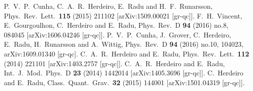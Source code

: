\documentclass[12pt]{article}
\begin{document}
\begin{small}
\begin{thebibliography}{99}
  P.~V.~P.~Cunha, C.~A.~R.~Herdeiro, E.~Radu and H.~F.~Runarsson,
  Phys.\ Rev.\ Lett.\  {\bf 115} (2015)   211102
  [arXiv:1509.00021 [gr-qc]].
  F.~H.~Vincent, E.~Gourgoulhon, C.~Herdeiro and E.~Radu,
  Phys.\ Rev.\ D {\bf 94} (2016) no.8,  084045
  [arXiv:1606.04246 [gr-qc]].
  P.~V.~P.~Cunha, J.~Grover, C.~Herdeiro, E.~Radu, H.~Runarsson and A.~Wittig,
 Phys.\ Rev.\ D {\bf 94} (2016) no.10,  104023, arXiv:1609.01340 [gr-qc].
  C.~A.~R.~Herdeiro and E.~Radu,
  Phys.\ Rev.\ Lett.\  {\bf 112} (2014) 221101
  [arXiv:1403.2757 [gr-qc]].
  C.~A.~R.~Herdeiro and E.~Radu,
  Int.\ J.\ Mod.\ Phys.\ D {\bf 23} (2014)   1442014
  [arXiv:1405.3696 [gr-qc]].
  C.~Herdeiro and E.~Radu,
  Class.\ Quant.\ Grav.\  {\bf 32} (2015)   144001
  [arXiv:1501.04319 [gr-qc]].

\end{thebibliography}
\end{small}
\end{document}
